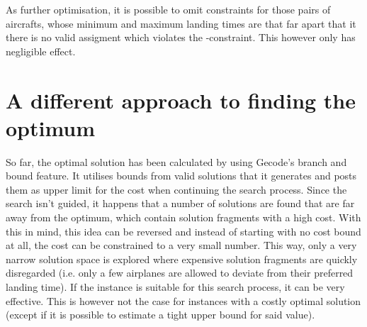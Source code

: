 \documentclass[,%
			paper=a4,%
			DIV12,
			liststotoc,
			bibtotoc,
			draft=false,%
			numbers=noendperiod
			]{scrartcl}
\begin{document}
As further optimisation, it is possible to omit constraints for those pairs of aircrafts, whose minimum and maximum landing times are that far apart that it there is no valid assigment which violates the \CseqDel-constraint. This however only has negligible effect.



\section{A different approach to finding the optimum}
So far, the optimal solution has been calculated by using Gecode's branch and bound feature.
It utilises bounds from valid solutions that it generates and posts them as upper limit for the cost when continuing the search process.
Since the search isn't guided, it happens that a number of solutions are found that are far away from the optimum, which contain solution fragments with a high cost. 
With this in mind, this idea can be reversed and instead of starting with no cost bound at all, the cost can be constrained to a very small number.
This way, only a very narrow solution space is explored where expensive solution fragments are quickly disregarded (i.e. only a few airplanes are allowed to deviate from their preferred landing time).
If the instance is suitable for this search process, it can be very effective.
This is however not the case for instances with a costly optimal solution (except if it is possible to estimate a tight upper bound for said value).
\end{document}
